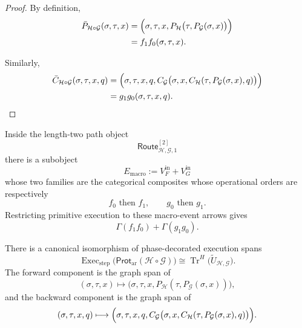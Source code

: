 \begin{proof}
By definition,
\[
\begin{aligned}
  \bar P_{\mathcal H\circ\mathcal G}
  (\sigma,\tau,x)
  &=
  \Bigl(
    \sigma,\tau,x,
    P_{\mathcal H}
    \bigl(
      \tau,
      P_{\mathcal G}(\sigma,x)
    \bigr)
  \Bigr)
  \\
  &=
  f_1f_0(\sigma,\tau,x).
\end{aligned}
\]

Similarly,
\[
\begin{aligned}
  \bar C_{\mathcal H\circ\mathcal G}
  (\sigma,\tau,x,q)
  &=
  \Bigl(
    \sigma,\tau,x,q,
    C_{\mathcal G}
    \bigl(
      \sigma,
      x,
      C_{\mathcal H}
      (
        \tau,
        P_{\mathcal G}(\sigma,x),
        q
      )
    \bigr)
  \Bigr)
  \\
  &=
  g_1g_0(\sigma,\tau,x,q).
\end{aligned}
\]
\end{proof}

Inside the length-two path object
\[
  \mathsf{Route}_{\mathcal H,\mathcal G,1}^{[2]}
\]
there is a subobject
\[
  E_{\mathrm{macro}}
  :=
  V_F^{\mathrm{in}}
  +
  V_G^{\mathrm{in}}
\]
whose two families are the categorical composites whose operational orders are respectively
\[
  f_0\text{ then }f_1,
  \qquad
  g_0\text{ then }g_1.
\]
Restricting primitive execution to these macro-event arrows gives
\[
  \Gamma(f_1f_0)
  +
  \Gamma(g_1g_0).
\]

\begin{theorem}
\label{thm:strategic-arena-composition-feedback}
There is a canonical isomorphism of phase-decorated execution spans
\[
  \boxed{
  \operatorname{Exec}_{\mathrm{step}}
  \bigl(
    \mathsf{Prot}_{\mathrm{ar}}
    (\mathcal H\circ\mathcal G)
  \bigr)
  \cong
  \operatorname{Tr}^{H}
  \bigl(
    \widetilde U_{\mathcal H,\mathcal G}
  \bigr).
  }
\]
The forward component is the graph span of
\[
  (\sigma,\tau,x)
  \longmapsto
  \bigl(
    \sigma,\tau,x,
    P_{\mathcal H}
    (
      \tau,
      P_{\mathcal G}(\sigma,x)
    )
  \bigr),
\]
and the backward component is the graph span of
\[
\begin{aligned}
  (\sigma,\tau,x,q)
  \longmapsto
  \Bigl(
    \sigma,\tau,x,q,
    C_{\mathcal G}
    \bigl(
      \sigma,
      x,
      C_{\mathcal H}
      (
        \tau,
        P_{\mathcal G}(\sigma,x),
        q
      )
    \bigr)
  \Bigr).
\end{aligned}
\]
\end{theorem}

